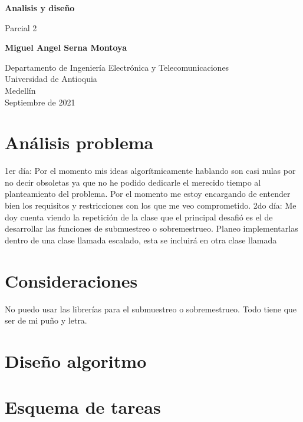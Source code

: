 \documentclass{article}
\begin{document}
\begin{titlepage}
    \begin{center}
        \vspace*{1cm}
            
        \Huge
        \textbf{Analisis y diseño}
            
        \vspace{0.5cm}
        \LARGE
        Parcial 2
            
        \vspace{1.5cm}
        \textbf{Miguel Angel Serna Montoya}
            
        \vfill
            
        \vspace{0.8cm}
            
        \Large
        Departamento de Ingeniería Electrónica y Telecomunicaciones\\
        Universidad de Antioquia\\
        Medellín\\
        Septiembre de 2021
            
    \end{center}
\end{titlepage}

\tableofcontents

\section{Análisis problema} \label{contenido}
1er día: Por el momento mis ideas algorítmicamente hablando son casi nulas por no decir obsoletas ya que no he podido dedicarle el merecido tiempo al planteamiento del problema. Por el momento me estoy encargando de entender bien los requisitos y restricciones con los que me veo comprometido.
2do día: Me doy cuenta viendo la repetición de la clase que el principal desafió es el de desarrollar las funciones de submuestreo o sobremestrueo. Planeo implementarlas dentro de una clase llamada escalado, esta se incluirá en otra clase llamada 
\section{Consideraciones}
No puedo usar las librerías para el submuestreo o sobremestrueo. Todo tiene que ser de mi puño y letra.
\section{Diseño algoritmo}
\section{Esquema de tareas}
\end{document}
